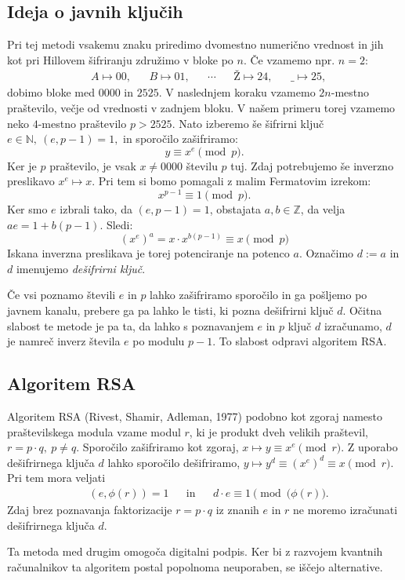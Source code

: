 \documentclass[12pt, a4paper]{article}
\begin{document}
\subsection{Ideja o javnih ključih}
Pri tej metodi vsakemu znaku priredimo dvomestno numerično vrednost in jih kot pri Hillovem šifriranju združimo v bloke po $n$. Če vzamemo npr. $n=2$:
\begin{align*}
&A\mapsto 00, &   &B\mapsto 01, & &\cdots &  &Ž\mapsto 24, &     &\_\mapsto 25,
\end{align*}
dobimo bloke med $0000$ in $2525$. V naslednjem koraku vzamemo $2n$-mestno praštevilo, večje od vrednosti v zadnjem bloku. V našem primeru torej vzamemo neko $4$-mestno praštevilo $p>2525$. Nato izberemo še šifrirni ključ $e\in \mathbb{N},\ (e,p-1)=1,$ in sporočilo zašifriramo:
$$
y\equiv x^e\pmod{p}.
$$
Ker je $p$ praštevilo, je vsak $x\neq 0000$ številu $p$ tuj. Zdaj potrebujemo še inverzno preslikavo $x^e\mapsto x$. Pri tem si bomo pomagali z malim Fermatovim izrekom:
$$
x^{p-1}\equiv 1\pmod p.
$$
Ker smo $e$ izbrali tako, da $(e,p-1)=1$, obstajata $a,b\in \mathbb{Z}$, da velja \mbox{$ae = 1 + b(p-1)$}. Sledi:
$$
(x^e)^a=x\cdot x^{b(p-1)}\equiv x \pmod p
$$
Iskana inverzna preslikava je torej potenciranje na potenco $a$. Označimo $d:=a$ in $d$ imenujemo \textit{dešifrirni ključ}.

Če vsi poznamo števili $e$ in $p$ lahko zašifriramo sporočilo in ga pošljemo po javnem kanalu, prebere ga pa lahko le tisti, ki pozna dešifrirni ključ $d$. Očitna slabost te metode je pa ta, da lahko s poznavanjem $e$ in $p$ ključ $d$ izračunamo, $d$ je namreč inverz števila $e$ po modulu $p-1$. To slabost odpravi algoritem RSA.

\subsection{Algoritem RSA}
Algoritem RSA (Rivest, Shamir, Adleman, 1977) podobno kot zgoraj namesto praštevilskega modula vzame modul $r$, ki je produkt dveh velikih praštevil, $r=p\cdot q,\ p\neq q$. Sporočilo zašifriramo kot zgoraj, $x\mapsto y\equiv x^e\pmod r$. Z uporabo dešifrirnega ključa $d$ lahko sporočilo dešifriramo, $y\mapsto y^d\equiv (x^e)^d\equiv x\pmod r$. Pri tem mora veljati
\begin{align*}
&(e,\phi(r))=1 & &\text{in} & &d\cdot e\equiv 1 \pmod{(\phi(r)}.
\end{align*}
Zdaj brez poznavanja faktorizacije $r=p\cdot q$ iz znanih $e$ in $r$ ne moremo izračunati dešifrirnega ključa $d$.

Ta metoda med drugim omogoča digitalni podpis. Ker bi z razvojem kvantnih računalnikov ta algoritem postal popolnoma neuporaben, se iščejo alternative.
\end{document}
